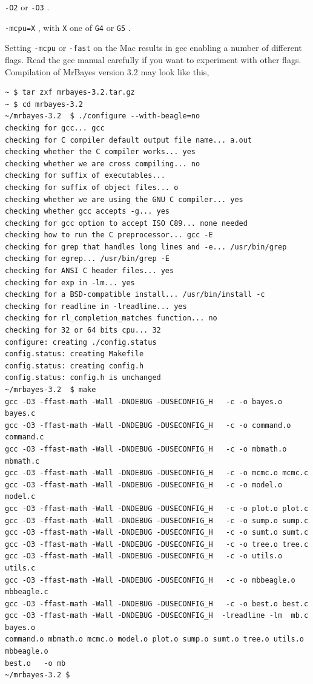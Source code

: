 \documentclass[12pt]{book}
\newcommand{\ttt}[1]{\texttt{#1} }
\begin{document}
  \ttt{-O2} or \ttt{-O3}.

  \ttt{-mcpu=X}, with \ttt{X} one of \ttt{G4} or \ttt{G5}.

Setting \ttt{-mcpu} or \ttt{-fast} on the Mac results in gcc enabling a number of different flags. Read the 
gcc manual carefully if you want to experiment with other flags.
Compilation of MrBayes version 3.2 may look like this,

\begin{singlespacing}
\small
\begin{verbatim}
~ $ tar zxf mrbayes-3.2.tar.gz
~ $ cd mrbayes-3.2
~/mrbayes-3.2  $ ./configure --with-beagle=no
checking for gcc... gcc
checking for C compiler default output file name... a.out
checking whether the C compiler works... yes
checking whether we are cross compiling... no
checking for suffix of executables... 
checking for suffix of object files... o
checking whether we are using the GNU C compiler... yes
checking whether gcc accepts -g... yes
checking for gcc option to accept ISO C89... none needed
checking how to run the C preprocessor... gcc -E
checking for grep that handles long lines and -e... /usr/bin/grep
checking for egrep... /usr/bin/grep -E
checking for ANSI C header files... yes
checking for exp in -lm... yes
checking for a BSD-compatible install... /usr/bin/install -c
checking for readline in -lreadline... yes
checking for rl_completion_matches function... no
checking for 32 or 64 bits cpu... 32
configure: creating ./config.status
config.status: creating Makefile
config.status: creating config.h
config.status: config.h is unchanged
~/mrbayes-3.2  $ make
gcc -O3 -ffast-math -Wall -DNDEBUG -DUSECONFIG_H   -c -o bayes.o bayes.c
gcc -O3 -ffast-math -Wall -DNDEBUG -DUSECONFIG_H   -c -o command.o command.c
gcc -O3 -ffast-math -Wall -DNDEBUG -DUSECONFIG_H   -c -o mbmath.o mbmath.c
gcc -O3 -ffast-math -Wall -DNDEBUG -DUSECONFIG_H   -c -o mcmc.o mcmc.c
gcc -O3 -ffast-math -Wall -DNDEBUG -DUSECONFIG_H   -c -o model.o model.c
gcc -O3 -ffast-math -Wall -DNDEBUG -DUSECONFIG_H   -c -o plot.o plot.c
gcc -O3 -ffast-math -Wall -DNDEBUG -DUSECONFIG_H   -c -o sump.o sump.c
gcc -O3 -ffast-math -Wall -DNDEBUG -DUSECONFIG_H   -c -o sumt.o sumt.c
gcc -O3 -ffast-math -Wall -DNDEBUG -DUSECONFIG_H   -c -o tree.o tree.c
gcc -O3 -ffast-math -Wall -DNDEBUG -DUSECONFIG_H   -c -o utils.o utils.c
gcc -O3 -ffast-math -Wall -DNDEBUG -DUSECONFIG_H   -c -o mbbeagle.o mbbeagle.c
gcc -O3 -ffast-math -Wall -DNDEBUG -DUSECONFIG_H   -c -o best.o best.c
gcc -O3 -ffast-math -Wall -DNDEBUG -DUSECONFIG_H  -lreadline -lm  mb.c bayes.o
command.o mbmath.o mcmc.o model.o plot.o sump.o sumt.o tree.o utils.o mbbeagle.o
best.o   -o mb
~/mrbayes-3.2 $ 
\end{verbatim}
\normalsize
\end{singlespacing}
\end{document}
